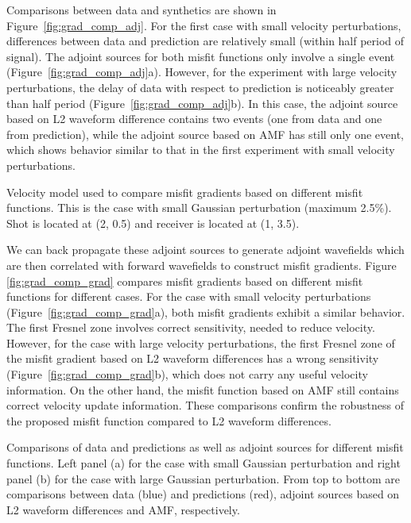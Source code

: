 Comparisons between data and synthetics are shown in Figure~\ref{fig:grad_comp_adj}. 
For the first case with small velocity perturbations, differences between data and prediction are 
relatively small (within half period of signal). The adjoint sources for both misfit functions only 
involve a single event (Figure~\ref{fig:grad_comp_adj}a). However, 
for the experiment with large velocity perturbations, the delay of data with respect to prediction 
is noticeably greater than half period (Figure~\ref{fig:grad_comp_adj}b). 
In this case, the adjoint source based on L2 waveform difference contains two events (one from data 
and one from prediction), while the adjoint source based on AMF has still only one event,
which shows behavior similar to that in the first experiment with small velocity perturbations. 

{\label{fig:grad_comp_model}
Velocity model used to compare misfit gradients based on different misfit functions. 
This is the case with small Gaussian perturbation (maximum 2.5\%). Shot is located at 
(2, 0.5) and receiver is located at (1, 3.5).}

We can back propagate these adjoint sources to generate adjoint wavefields which are then 
correlated with forward wavefields to construct misfit gradients. 
Figure \ref{fig:grad_comp_grad} compares misfit gradients based on 
different misfit functions for different cases. For the case with small velocity 
perturbations (Figure~\ref{fig:grad_comp_grad}a), both misfit gradients 
exhibit a similar behavior. The first Fresnel zone involves correct sensitivity, needed to 
reduce velocity. However, for the case with large velocity perturbations, 
the first Fresnel zone of the misfit gradient based on L2 waveform differences 
has a wrong sensitivity (Figure~\ref{fig:grad_comp_grad}b), which does not carry any useful velocity information. 
On the other hand, the 
misfit function based on AMF still contains correct velocity update 
information. These comparisons confirm the robustness of the proposed misfit function 
compared to L2 waveform differences.

{\label{fig:grad_comp_adj}
Comparisons of data and predictions as well as adjoint sources for different misfit functions. 
Left panel (a) for the case with small Gaussian perturbation and right panel (b) for the case with 
large Gaussian perturbation. From top to bottom are comparisons between data (blue) and predictions (red), 
adjoint sources based on L2 waveform differences and AMF, respectively.}

